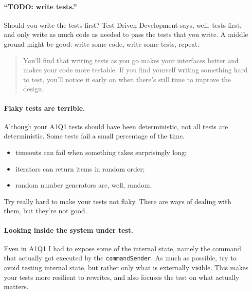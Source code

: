 \documentclass[11pt]{article}
\begin{document}
\paragraph{``TODO: write tests.''} Should you write the tests first? Test-Driven Development says, well,
tests first, and only write as much code as needed to pass the tests that you write. 
A middle ground might be good: write some code, write some tests, repeat.

\begin{quote}
You'll find that writing tests as you go makes your interfaces better and makes your code more testable. If you find yourself writing something hard to test, you'll notice it early on when there's still time to improve the design.
\end{quote}

\paragraph{Flaky tests are terrible.} Although your A1Q1 tests should have been 
deterministic, not all tests are deterministic. Some tests fail a small percentage
of the time. 
\begin{itemize}
\item timeouts can fail when something takes surprisingly long;
\item iterators can return items in random order;
\item random number generators are, well, random.
\end{itemize}
Try really hard to make your tests not flaky. There are ways of dealing with them,
but they're not good.

\paragraph{Looking inside the system under test.}
Even in A1Q1 I had to expose some of the internal state, namely the command that actually
got executed by the {\tt commandSender}. As much as possible, try to avoid testing internal
state, but rather only what is externally visible. This makes your tests more resilient to rewrites,
and also focuses the test on what actually matters.
\end{document}
